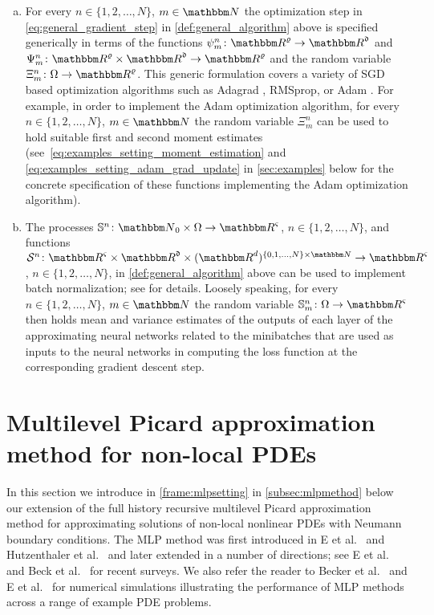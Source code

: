 \begin{enumerate}[(a)]
	\item For every $n\in\{1,2,\dots,N\}$, $m\in\N$ the optimization step in \cref{eq:general_gradient_step} in \cref{def:general_algorithm} above is specified generically in terms of the functions $\psi^n_m\colon \R^{\varrho}\to\R^{\mathfrak d}$ and $\Psi^n_m\colon\R^{\varrho}\times\R^{\mathfrak d}\to\R^{\varrho}$ and the random variable $\Xi^n_m\colon \Omega\to\R^{\varrho}$. This generic formulation covers a variety of SGD based optimization algorithms such as Adagrad \cite{duchi2011adaptive}, RMSprop, or Adam \cite{Kingma2014}. For example, in order to implement the Adam optimization algorithm, for every $n\in\{1,2,\dots,N\}$, $m\in\N$ the random variable $\Xi^n_m$ can be used to hold suitable first and second moment estimates (see~\cref{eq:examples_setting_moment_estimation} and \cref{eq:examples_setting_adam_grad_update} in \cref{sec:examples} below for the concrete specification of these functions implementing the Adam optimization algorithm).
	\item The processes $\mathbb{S}^n\colon \N_0\times\Omega \to \R^{\varsigma}$, $n\in\{1,2,\ldots,N\}$, and functions $\mathcal S^n\colon \R^{\varsigma}\times\R^{\mathfrak d}\times(\R^d)^{\{0,1,\dots,N\}\times\N}\to\R^\varsigma$, $n\in\{1,2,\dots,N\}$, in \cref{def:general_algorithm} above can be used to implement batch normalization; see \cite{ioffe2015batch} for details. Loosely speaking, for every $n\in\{1,2,\dots,N\}$, $m\in\N$ the random variable $\mathbb S^n_m\colon \Omega\to\R^\varsigma$ then holds mean and variance estimates of the outputs of each layer of the approximating neural networks related to the minibatches that are used as inputs to the neural networks in computing the loss function at the corresponding gradient descent step.
\end{enumerate}

\section{Multilevel Picard approximation method for non-local PDEs}
\label{sec:MLP}

In this section we introduce in \cref{frame:mlpsetting} in \cref{subsec:mlpmethod} below our extension of the full history recursive multilevel Picard approximation method for approximating solutions of non-local nonlinear PDEs with Neumann boundary conditions. The MLP method was first introduced in E et al.~\cite{Weinan2021} and Hutzenthaler et al.~\cite{Hutzenthaler2020} and later extended in a number of directions; see E et al.~\cite{E2020} and Beck et al.~\cite{Beck2020} for recent surveys. We also refer the reader to Becker et al.~\cite{becker2020numerical} and E et al.~\cite{E2019multilevel} for numerical simulations illustrating the performance of MLP methods across a range of example PDE problems.

